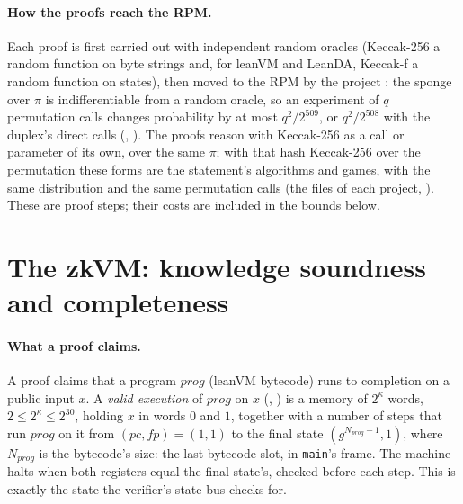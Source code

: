\documentclass[11pt]{article}
\begin{document}
\paragraph{How the proofs reach the RPM.} Each proof is first carried out with independent random
oracles (Keccak-256 a random function on byte strings and, for leanVM and LeanDA, Keccak-f a random
function on states), then moved to the RPM by the project : the sponge over $\pi$ is
indifferentiable from a random oracle, so an experiment of $q$ permutation calls changes
probability by at most $q^2/2^{509}$, or $q^2/2^{508}$ with the duplex's direct calls
(, ). The proofs reason with Keccak-256 as a call or parameter of its own, over
the same $\pi$; with that hash Keccak-256 over the permutation these forms are the statement's
algorithms and games, with the same distribution and the same permutation calls (the
 files of each project, ). These are proof steps; their
costs are included in the bounds below.

\section{The zkVM: knowledge soundness and completeness}\label{sec:zkvm}

\paragraph{What a proof claims.} A proof claims that a program $\mathit{prog}$ (leanVM bytecode) runs to completion on a public input $x$. A \emph{valid execution} of $\mathit{prog}$ on $x$ (, ) is a memory of $2^\kappa$ words, $2 \le 2^\kappa \le 2^{30}$, holding $x$ in words $0$ and $1$, together with a number of steps that run $\mathit{prog}$ on it from $(\mathit{pc}, \mathit{fp}) = (1, 1)$ to the final state $(g^{N_{\mathit{prog}}-1}, 1)$, where $N_{\mathit{prog}}$ is the bytecode's size: the last bytecode slot, in \texttt{main}'s frame. The machine halts when both registers equal the final state's, checked before each step. This is exactly the state the verifier's state bus checks for.
\end{document}
